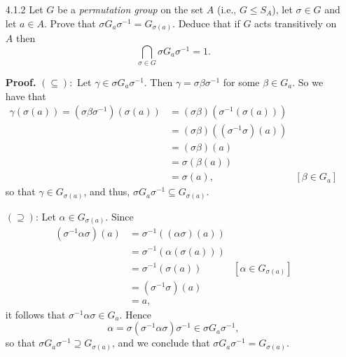 \documentclass[9pt]{article}
\begin{document}
\begin{enumerate}
   \item[4.1.2]   Let $G$ be a \textit{permutation group} on the set $A$
                  (i.e., $G \le S_A$), let $\sigma \in G$ and let $a \in A$.
                  Prove that $\sigma G_a\sigma^{-1} = G_{\sigma(a)}$. Deduce
                  that if $G$ acts transitively on $A$ then
                  $$\bigcap_{\sigma \in G}\sigma G_a\sigma^{-1} = 1.$$
                  
      \textbf{Proof.} $(\subseteq):$ Let $\gamma \in \sigma G_a\sigma^{-1}$.
      Then $\gamma = \sigma \beta\sigma^{-1}$ for some $\beta \in G_a$. So we
      have that
      \begin{align*}
         \gamma(\sigma(a)) = (\sigma \beta\sigma^{-1})(\sigma(a)) &=
            (\sigma \beta)(\sigma^{-1}(\sigma(a))) \\
            &= (\sigma \beta)((\sigma^{-1}\sigma)(a)) \\
            &= (\sigma \beta)(a) \\
            &= \sigma(\beta(a)) \\
            &= \sigma(a),  & [\beta \in G_a]
      \end{align*}
      so that $\gamma \in G_{\sigma(a)}$, and thus,
      $\sigma G_a\sigma^{-1} \subseteq G_{\sigma(a)}$.
      
      $(\supseteq)$: Let $\alpha \in G_{\sigma(a)}$. Since
      \begin{align*}
         (\sigma^{-1}\alpha\sigma)(a) &= \sigma^{-1}((\alpha\sigma)(a)) \\
            &= \sigma^{-1}(\alpha(\sigma(a))) \\
            &= \sigma^{-1}(\sigma(a)) &[\alpha \in G_{\sigma(a)}] \\
            &= (\sigma^{-1}\sigma)(a) \\
            &= a,
      \end{align*}
      it follows that $\sigma^{-1}\alpha\sigma \in G_a$. Hence
      $$\alpha = \sigma(\sigma^{-1}\alpha\sigma)\sigma^{-1} \in \sigma
        G_a\sigma^{-1},$$
      so that $\sigma G_a\sigma^{-1} \supseteq G_{\sigma(a)}$, and we conclude
      that $\sigma G_a\sigma^{-1} = G_{\sigma(a)}$.


\end{enumerate}
\end{document}
